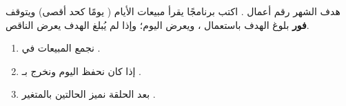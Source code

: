 \begin{statement}
هدف الشهر رقم أعمال . اكتب برنامجًا يقرأ مبيعات الأيام ( يومًا كحد أقصى) ويتوقف \textbf{فور} بلوغ الهدف باستعمال ، ويعرض اليوم؛ وإذا لم يُبلغ الهدف يعرض الناقص.
\end{statement}
\begin{stepsbox}\begin{enumerate}
\item نجمع المبيعات في .
\item إذا كان  نحفظ اليوم ونخرج بـ .
\item بعد الحلقة نميز الحالتين بالمتغير .
\end{enumerate}\end{stepsbox}
